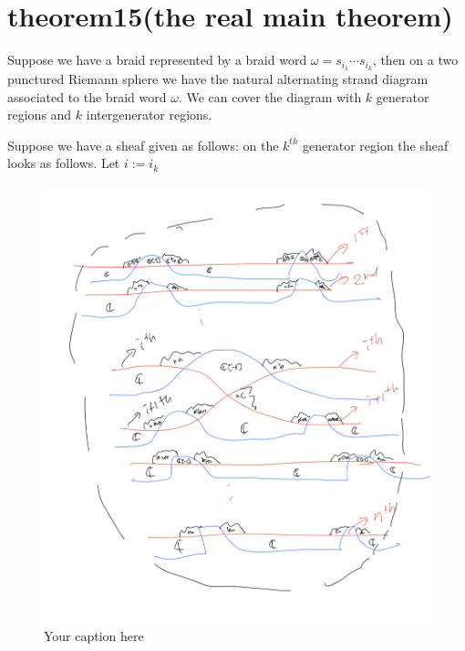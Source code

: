 \section{theorem15(the real main theorem)}
\begin{theorem}
\end{theorem}

Suppose we have a braid represented by a braid word $\omega = s_{i_1}\cdots s_{i_k}$, then on a two punctured Riemann sphere we have the natural alternating strand diagram associated to the braid word $\omega$. We can cover the diagram with $k$ generator regions and $k$ intergenerator regions.

Suppose we have a sheaf given as follows:
on the $k^{th}$ generator region the sheaf looks as follows. Let $i := i_k$

\begin{figure}[H] %
    \centering
    \includegraphics[width=\linewidth]{diagrams/theorem15/1.png} %
    \caption{Your caption here}
    \label{fig:your-label}
\end{figure}


